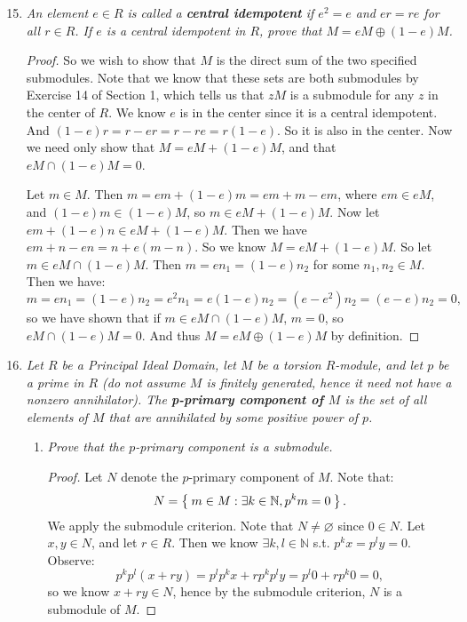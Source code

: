 \documentclass[10pt,oneside,reqno]{amsart}
\theoremstyle{plain}
\newcommand{\n}{\mathbb{N}}
\theoremstyle{definition}
\theoremstyle{remark}
\begin{document}
\begin{enumerate}[label=\arabic*.]

\setcounter{enumi}{14}
\item \textit{An element $e \in R$ is called a \textbf{central idempotent} if $e^2 = e$ and $er = re$ for all $r \in R$. If $e$ is a central idempotent in $R$, prove that $M = eM \oplus (1 - e)M$. }

\begin{proof}
So we wish to show that $M$ is the direct sum of the two specified submodules. Note that we know that these sets are both submodules by Exercise 14 of Section 1, which tells us that $zM$ is a submodule for any $z$ in the center of $R$. We know $e$ is in the center since it is a central idempotent. And $(1 - e)r = r - er = r - re = r(1 - e)$. So it is also in the center. Now we need only show that $M = eM + (1 - e)M$, and that $eM \cap (1 - e)M = 0$. 


Let $m \in M$. Then $m = em + (1 - e)m = em + m - em$, where $em \in eM$, and $(1 - e)m \in (1 - e)M$, so $m \in eM + (1 - e)M$. Now let $em + (1 - e)n \in eM + (1 - e)M$. Then we have $em + n - en = n + e(m - n)$. So we know $M = eM + (1 - e)M$. So let $m \in eM \cap (1 - e)M$. Then $m = en_1 = (1 - e)n_2$ for some $n_1,n_2 \in M$. Then we have: 
$$
m = en_1 = (1 - e)n_2 = e^2n_1 = e(1 - e)n_2 = (e - e^2)n_2 = (e - e)n_2 = 0,
$$
so we have shown that if $m \in eM \cap (1 - e)M$, $m = 0$, so $eM \cap (1 - e)M = 0$. And thus $M = eM \oplus (1 - e)M$ by definition. 
\end{proof}

\setcounter{enumi}{21}
 \item \textit{Let $R$ be a Principal Ideal Domain, let $M$ be a torsion $R$-module, and let $p$ be a prime in $R$ (do not assume $M$ is finitely generated, hence it need not have a nonzero annihilator). The \textbf{p-primary component of $M$} is the set of all elements of $M$ that are annihilated by some positive power of $p$. }
 \begin{enumerate}
 \item \textit{Prove that the $p$-primary component is a submodule. }
 \begin{proof}
 Let $N$ denote the $p$-primary component of $M$. Note that: 
 $$
 N = \Set{m \in M: \exists k\in \n,p^km = 0}. 
 $$
We apply the submodule criterion. Note that $N \neq \varnothing$ since $0 \in N$. Let $x,y \in N$, and let $r \in R$. Then we know $\exists k,l \in \n$ s.t. $p^kx = p^ly = 0$. Observe: 
$$
p^kp^l(x + ry) = p^lp^kx + rp^kp^ly = p^l0 + rp^k0 = 0,
$$
so we know $x + ry \in N$, hence by the submodule criterion, $N$ is a submodule of $M$. 
 \end{proof}
 

\end{enumerate}
\end{enumerate}
\end{document}
